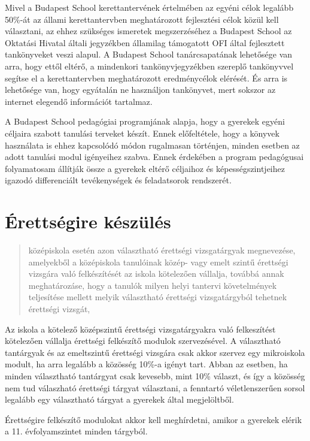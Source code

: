 Mivel a Budapest School kerettantervének értelmében az egyéni célok
legalább 50\%-át az állami kerettantervben meghatározott fejlesztési
célok közül kell választani, az ehhez szükséges ismeretek megszerzéséhez
a Budapest School az Oktatási Hivatal általi jegyzékben államilag
támogatott OFI által fejlesztett tankönyveket veszi alapul. A Budapest
School tanárcsapatának lehetősége van arra, hogy ettől eltérő, a
mindenkori tankönyvjegyzékben szereplő tankönyvvel segítse el a
kerettantervben meghatározott eredménycélok elérését. És arra is
lehetősége van, hogy egyátalán ne használjon tankönyvet, mert sokszor az
internet elegendő információt tartalmaz.

A Budapest School pedagógiai programjának alapja, hogy a gyerekek egyéni
céljaira szabott tanulási terveket készít. Ennek előfeltétele, hogy a
könyvek használata is ehhez kapcsolódó módon rugalmasan történjen,
minden esetben az adott tanulási modul igényeihez szabva. Ennek
érdekében a program pedagógusai folyamatosam állítják össze a gyerekek
eltérő céljaihoz és képességszintjeihez igazodó differenciált
tevékenységek és feladatsorok rendszerét.

\section{Érettségire készülés }

\begin{quote}
      középiskola esetén azon választható érettségi vizsgatárgyak megnevezése,
      amelyekből a középiskola tanulóinak közép- vagy emelt szintű érettségi
      vizsgára való felkészítését az iskola kötelezően vállalja, továbbá annak
      meghatározáse, hogy a tanulók milyen helyi tantervi követelmények
      teljesítése mellett melyik választható érettségi vizsgatárgyból tehetnek
      érettségi vizsgát,
\end{quote}

Az iskola a kötelező középszintű érettségi vizsgatárgyakra való
felkeszítést kötelezően vállalja érettségi felkészítő modulok
szervezésével. A
választható tantárgyak és az emeltszintű érettségi vizsgára csak akkor
szervez egy mikroiskola modult, ha arra legalább a közösség 10\%-a
igényt tart. Abban az esetben, ha minden választható tantárgyat csak kevesebb,
mint 10\% választ, és így a közösség nem tud válaszható érettségi tárgyat
választani, a fenntartó véletlenszerűen sorsol legalább egy választható tárgyat
a gyerekek által megjelöltből.

Érettségire felkészítő modulokat akkor kell meghírdetni, amikor a gyerekek
elérik a 11. évfolyamszintet minden tárgyból.

